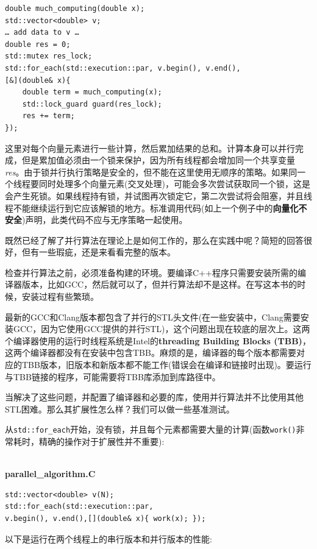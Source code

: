 \begin{lstlisting}[style=styleCXX]
double much_computing(double x);
std::vector<double> v;
… add data to v … 
double res = 0;
std::mutex res_lock;
std::for_each(std::execution::par, v.begin(), v.end(),
[&](double& x){ 
	double term = much_computing(x);
	std::lock_guard guard(res_lock);
	res += term;
});
\end{lstlisting}

这里对每个向量元素进行一些计算，然后累加结果的总和。计算本身可以并行完成，但是累加值必须由一个锁来保护，因为所有线程都会增加同一个共享变量\textit{res}。由于锁并行执行策略是安全的，但不能在这里使用无顺序的策略。如果同一个线程要同时处理多个向量元素(交叉处理)，可能会多次尝试获取同一个锁，这是会产生死锁。如果线程持有锁，并试图再次锁定它，第二次尝试将会阻塞，并且线程不能继续运行到它应该解锁的地方。标准调用代码(如上一个例子中的\textbf{向量化不安全})声明，此类代码不应与无序策略一起使用。 

既然已经了解了并行算法在理论上是如何工作的，那么在实践中呢？简短的回答很好，但有一些瑕疵，还是来看看完整的版本。

检查并行算法之前，必须准备构建的环境。要编译C++程序只需要安装所需的编译器版本，比如GCC，然后就可以了，但并行算法却不是这样。在写这本书的时候，安装过程有些繁琐。

最新的GCC和Clang版本都包含了并行的STL头文件(在一些安装中，Clang需要安装GCC，因为它使用GCC提供的并行STL)，这个问题出现在较底的层次上。这两个编译器使用的运行时线程系统是Intel的\textbf{threading Building Blocks (TBB)}，这两个编译器都没有在安装中包含TBB。麻烦的是，编译器的每个版本都需要对应的TBB版本，旧版本和新版本都不能工作(错误会在编译和链接时出现)。要运行与TBB链接的程序，可能需要将TBB库添加到库路径中。

当解决了这些问题，并配置了编译器和必要的库，使用并行算法并不比使用其他STL困难。那么其扩展性怎么样？我们可以做一些基准测试。 

从\texttt{std::for\_each}开始，没有锁，并且每个元素都需要大量的计算(函数\texttt{work()}非常耗时，精确的操作对于扩展性并不重要):

\hspace*{\fill} \\ %
\noindent
\textbf{parallel\_algorithm.C}
\begin{lstlisting}[style=styleCXX]
std::vector<double> v(N);
std::for_each(std::execution::par,
v.begin(), v.end(),[](double& x){ work(x); });
\end{lstlisting}

以下是运行在两个线程上的串行版本和并行版本的性能:

